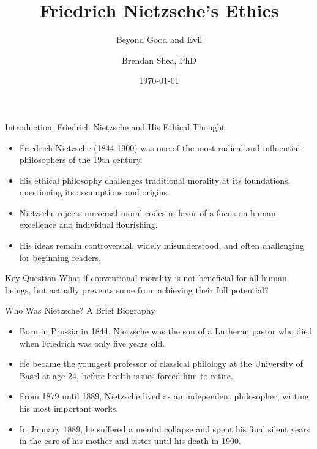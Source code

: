 \documentclass{beamer}
\title{Friedrich Nietzsche's Ethics}
\subtitle{Beyond Good and Evil}
\author{Brendan Shea, PhD}
\date{\today}
\begin{document}
\begin{frame}
\titlepage
\end{frame}

\begin{frame}{Introduction: Friedrich Nietzsche and His Ethical Thought}
\begin{itemize}
\item Friedrich Nietzsche (1844-1900) was one of the most radical and influential philosophers of the 19th century.
\item His ethical philosophy challenges traditional morality at its foundations, questioning its assumptions and origins.
\item Nietzsche rejects universal moral codes in favor of a focus on human excellence and individual flourishing.
\item His ideas remain controversial, widely misunderstood, and often challenging for beginning readers.
\end{itemize}

\begin{alertblock}{Key Question}
What if conventional morality is not beneficial for all human beings, but actually prevents some from achieving their full potential?
\end{alertblock}
\end{frame}

\begin{frame}{Who Was Nietzsche? A Brief Biography}
\begin{itemize}
\item Born in Prussia in 1844, Nietzsche was the son of a Lutheran pastor who died when Friedrich was only five years old.
\item He became the youngest professor of classical philology at the University of Basel at age 24, before health issues forced him to retire.
\item From 1879 until 1889, Nietzsche lived as an independent philosopher, writing his most important works.
\item In January 1889, he suffered a mental collapse and spent his final silent years in the care of his mother and sister until his death in 1900.
\end{itemize}

\begin{center}
\scriptsize
{}
\end{center}
\end{frame}
\end{document}
